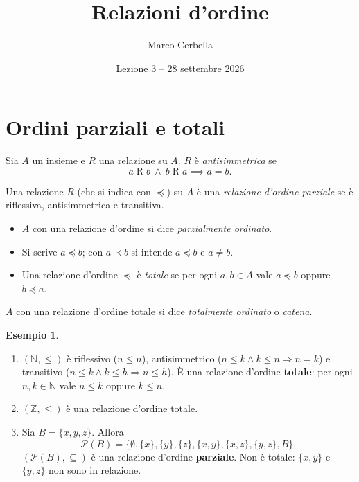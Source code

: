 \documentclass[11pt,a4paper]{article}
\title{Relazioni d'ordine}
\author{Marco Cerbella}
\date{Lezione 3 -- 28 settembre 2026}
\theoremstyle{definition}
\newtheorem*{esempio}{Esempio}
\begin{document}
\maketitle

\section{Ordini parziali e totali}

\begin{definizione}
Sia $A$ un insieme e $R$ una relazione su $A$. $R$ è
\emph{antisimmetrica} se
\[
a \mathrel{R} b \ \land\ b \mathrel{R} a \implies a = b.
\]
\end{definizione}

\begin{definizione}
Una relazione $R$ (che si indica con $\preceq$) su $A$ è una
\emph{relazione d'ordine parziale} se è riflessiva, antisimmetrica e
transitiva.
\end{definizione}

\begin{itemize}
    \item $A$ con una relazione d'ordine si dice \emph{parzialmente
          ordinato}.
    \item Si scrive $a \preceq b$; con $a \prec b$ si intende
          $a \preceq b$ e $a \neq b$.
    \item Una relazione d'ordine $\preceq$ è \emph{totale} se per ogni
          $a, b \in A$ vale $a \preceq b$ oppure $b \preceq a$.
\end{itemize}
$A$ con una relazione d'ordine totale si dice \emph{totalmente ordinato}
o \emph{catena}.

\begin{esempio}
\leavevmode
\begin{enumerate}
    \item $(\mathbb{N}, \leq)$ è riflessivo ($n \leq n$), antisimmetrico
          ($n \leq k \land k \leq n \Rightarrow n = k$) e transitivo
          ($n \leq k \land k \leq h \Rightarrow n \leq h$). È una
          relazione d'ordine \textbf{totale}: per ogni $n, k \in
          \mathbb{N}$ vale $n \leq k$ oppure $k \leq n$.

    \item $(\mathbb{Z}, \leq)$ è una relazione d'ordine totale.

    \item Sia $B = \{x, y, z\}$. Allora
          \[
          \mathcal{P}(B) = \big\{\emptyset, \{x\}, \{y\}, \{z\},
          \{x,y\}, \{x,z\}, \{y,z\}, B\big\}.
          \]
          $(\mathcal{P}(B), \subseteq)$ è una relazione d'ordine
          \textbf{parziale}. Non è totale: $\{x, y\}$ e $\{y, z\}$ non
          sono in relazione.
\end{enumerate}
\end{esempio}
\end{document}
